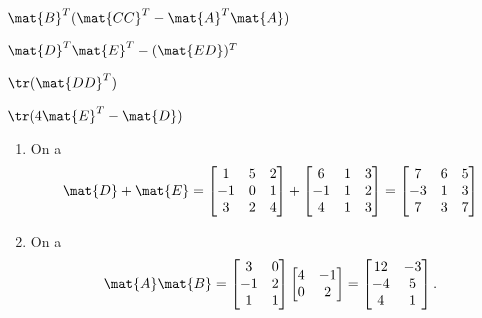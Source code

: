 \begin{exercice}
\begin{enumerate}
\begin{multicols}{2}
    \item $\mat{B}^T (\mat{CC}^T - \mat{A}^T \mat{A})$
    \item $\mat{D}^T \mat{E}^T - (\mat{ED})^T$
    \end{multicols}
    \vspace{-1.5\baselineskip}
    \begin{multicols}{2}
    \item $\tr(\mat{DD}^T)$
    \item $\tr(4 \mat{E}^T - \mat{D})$
    \end{multicols}
  \end{enumerate}
  \begin{sol}
    \begin{enumerate}
    \item On a
      \begin{displaymath}
        \mat{D} + \mat{E}
        =
        \begin{bmatrix}
          1 & 5 & 2 \\ -1 & 0 & 1 \\ 3 & 2 & 4
        \end{bmatrix} +
        \begin{bmatrix}
          6 & 1 & 3 \\ -1 & 1 & 2 \\ 4 & 1 & 3
        \end{bmatrix}
        =
        \begin{bmatrix}
          7 & 6 & 5 \\ -3 & 1 & 3 \\ 7 & 3 & 7
        \end{bmatrix}
      \end{displaymath}
    \item On a
      \begin{displaymath}
        \mat{A} \mat{B}
        =
        \begin{bmatrix}
          3 & 0 \\ -1 & 2 \\ 1 & 1
        \end{bmatrix}
        \begin{bmatrix}
          4 & -1 \\ 0 & 2
        \end{bmatrix}
        =
        \begin{bmatrix}
          12 & -3 \\ -4 & 5 \\ 4 & 1
        \end{bmatrix}.
      \end{displaymath}

\end{enumerate}
\end{sol}
\end{exercice}
